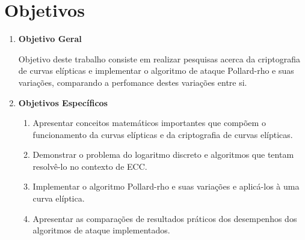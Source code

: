 \section*{Objetivos}
\begin{enumerate}
	\item \textbf{Objetivo Geral}

Objetivo deste trabalho consiste em realizar pesquisas acerca da criptografia de curvas elípticas e implementar o algoritmo de ataque Pollard-rho e suas variações, comparando a perfomance destes variações entre si.

	\item \textbf{Objetivos Específicos}
	\begin{enumerate}
		\item Apresentar conceitos matemáticos importantes que compõem o funcionamento da curvas elípticas e da criptografia de curvas elípticas.
		\item Demonstrar o problema do logaritmo discreto e algoritmos que tentam resolvê-lo no contexto de ECC.
		\item Implementar o algoritmo Pollard-rho e suas variações e aplicá-los à uma curva elíptica.
		\item Apresentar as comparações de resultados práticos dos desempenhos dos algoritmos de ataque implementados.
	\end{enumerate}
\end{enumerate}
